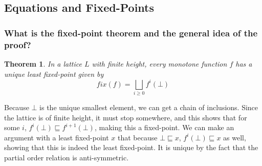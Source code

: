 \documentclass[12pt]{article}
\newenvironment{proof-idea}{\noindent{\bf Proof Idea}\hspace*{1em}}{\qed\bigskip}
\newtheorem*{theorem}{Theorem}
\theoremstyle{remark}
\theoremstyle{remark}
\begin{document}
\subsection{Equations and Fixed-Points}
\subsubsection{What is the fixed-point theorem and the general idea of the proof?}
\begin{theorem}
    In a lattice $L$ with finite height, every monotone function $f$ has a unique least fixed-point given by
    \[fix(f) = \bigsqcup_{i \geq 0} f^i (\bot)\]
\end{theorem}
\begin{proof-idea}
Because $\bot$ is the unique smallest element, we can get a chain of inclusions. Since the lattice is of finite height, it must stop somewhere, and this shows that for some $i$, $f^i(\bot) \sqsubseteq f^{i+1}(\bot)$, making this a fixed-point. We can make an argument with a least fixed-point $x$ that because $\bot \sqsubseteq x$, $f^i(\bot) \sqsubseteq x$ as well, showing that this is indeed the least fixed-point. It is unique by the fact that the partial order relation is anti-symmetric.
\end{proof-idea}

\end{document}
